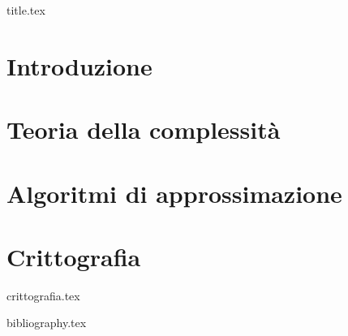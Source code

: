 \documentclass[a4paper,11pt,oneside]{book}
\begin{document}

\frontmatter

{title.tex}

\tableofcontents

\mainmatter


\chapter{Introduzione}

\chapter{Teoria della complessità}

\chapter{Algoritmi di approssimazione}

\chapter{Crittografia}
{crittografia.tex}

\cleardoublepage

{bibliography.tex}
\end{document}
